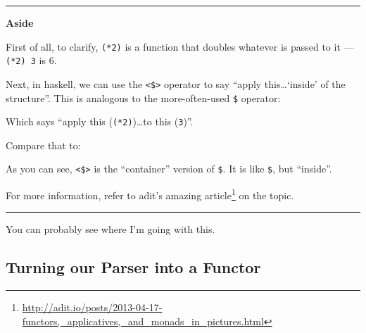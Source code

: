 \documentclass[]{article}
\newenvironment{Shaded}{}{}
\newcommand{\DataTypeTok}[1]{\textcolor[rgb]{0.56,0.13,0.00}{#1}}
\newcommand{\DecValTok}[1]{\textcolor[rgb]{0.25,0.63,0.44}{#1}}
\newcommand{\NormalTok}[1]{#1}
\newcommand{\OperatorTok}[1]{\textcolor[rgb]{0.40,0.40,0.40}{#1}}
\renewcommand{\href}[2]{#2\footnote{\url{#1}}}
\begin{document}
\begin{center}\rule{0.5\linewidth}{0.5pt}\end{center}

\textbf{Aside}

First of all, to clarify, \texttt{(*2)} is a function that doubles whatever is
passed to it --- \texttt{(*2)\ 3} is 6.

Next, in haskell, we can use the \texttt{\textless{}\$\textgreater{}} operator
to say ``apply this\ldots{}`inside' of the structure''. This is analogous to the
more-often-used \texttt{\$} operator:

\begin{Shaded}
\end{Shaded}

Which says ``apply this (\texttt{(*2)})\ldots to this (\texttt{3})''.

Compare that to:

\begin{Shaded}
\end{Shaded}

As you can see, \texttt{\textless{}\$\textgreater{}} is the ``container''
version of \texttt{\$}. It is like \texttt{\$}, but ``inside''.

For more information, refer to adit's
\href{http://adit.io/posts/2013-04-17-functors,_applicatives,_and_monads_in_pictures.html}{amazing
article} on the topic.

\begin{center}\rule{0.5\linewidth}{0.5pt}\end{center}

You can probably see where I'm going with this.

\subsection{Turning our Parser into a
Functor}\label{turning-our-parser-into-a-functor}
\end{document}
